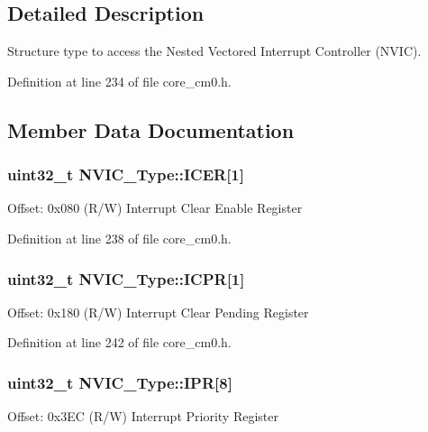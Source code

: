 \subsection{Detailed Description}
Structure type to access the Nested Vectored Interrupt Controller (N\+V\+IC). 

Definition at line 234 of file core\+\_\+cm0.\+h.



\subsection{Member Data Documentation}
\subsubsection[{\texorpdfstring{I\+C\+ER}{ICER}}]{ uint32\+\_\+t N\+V\+I\+C\+\_\+\+Type\+::\+I\+C\+ER\mbox{[}1\mbox{]}}\hypertarget{struct_n_v_i_c___type_a1d18c89c94cf0f7ece8db0d5351aced9}{}\label{struct_n_v_i_c___type_a1d18c89c94cf0f7ece8db0d5351aced9}
Offset\+: 0x080 (R/W) Interrupt Clear Enable Register 

Definition at line 238 of file core\+\_\+cm0.\+h.

\subsubsection[{\texorpdfstring{I\+C\+PR}{ICPR}}]{ uint32\+\_\+t N\+V\+I\+C\+\_\+\+Type\+::\+I\+C\+PR\mbox{[}1\mbox{]}}\hypertarget{struct_n_v_i_c___type_a0dccb8954db63a673212815f56031625}{}\label{struct_n_v_i_c___type_a0dccb8954db63a673212815f56031625}
Offset\+: 0x180 (R/W) Interrupt Clear Pending Register 

Definition at line 242 of file core\+\_\+cm0.\+h.

\subsubsection[{\texorpdfstring{I\+PR}{IPR}}]{ uint32\+\_\+t N\+V\+I\+C\+\_\+\+Type\+::\+I\+PR\mbox{[}8\mbox{]}}\hypertarget{struct_n_v_i_c___type_a2e29b486ab9ebee3eba25091aff18ec6}{}\label{struct_n_v_i_c___type_a2e29b486ab9ebee3eba25091aff18ec6}
Offset\+: 0x3\+EC (R/W) Interrupt Priority Register 


